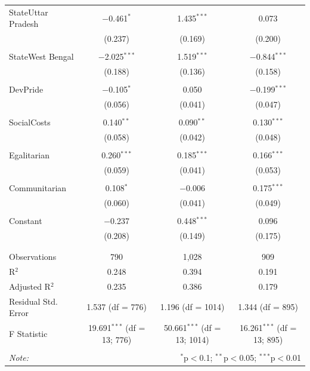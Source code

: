 \documentclass[
]{article}
\begin{document}
\begin{table}[!htbp]
\begin{tabular}{@{\extracolsep{5pt}}lccc}
 StateUttar Pradesh & $-$0.461$^{*}$ & 1.435$^{***}$ & 0.073 \\ 
  & (0.237) & (0.169) & (0.200) \\ 
  & & & \\ 
 StateWest Bengal & $-$2.025$^{***}$ & 1.519$^{***}$ & $-$0.844$^{***}$ \\ 
  & (0.188) & (0.136) & (0.158) \\ 
  & & & \\ 
 DevPride & $-$0.105$^{*}$ & 0.050 & $-$0.199$^{***}$ \\ 
  & (0.056) & (0.041) & (0.047) \\ 
  & & & \\ 
 SocialCosts & 0.140$^{**}$ & 0.090$^{**}$ & 0.130$^{***}$ \\ 
  & (0.058) & (0.042) & (0.048) \\ 
  & & & \\ 
 Egalitarian & 0.260$^{***}$ & 0.185$^{***}$ & 0.166$^{***}$ \\ 
  & (0.059) & (0.041) & (0.053) \\ 
  & & & \\ 
 Communitarian & 0.108$^{*}$ & $-$0.006 & 0.175$^{***}$ \\ 
  & (0.060) & (0.041) & (0.049) \\ 
  & & & \\ 
 Constant & $-$0.237 & 0.448$^{***}$ & 0.096 \\ 
  & (0.208) & (0.149) & (0.175) \\ 
  & & & \\ 
\hline \\[-1.8ex] 
Observations & 790 & 1,028 & 909 \\ 
R$^{2}$ & 0.248 & 0.394 & 0.191 \\ 
Adjusted R$^{2}$ & 0.235 & 0.386 & 0.179 \\ 
Residual Std. Error & 1.537 (df = 776) & 1.196 (df = 1014) & 1.344 (df = 895) \\ 
F Statistic & 19.691$^{***}$ (df = 13; 776) & 50.661$^{***}$ (df = 13; 1014) & 16.261$^{***}$ (df = 13; 895) \\ 
\hline 
\hline \\[-1.8ex] 
\textit{Note:}  & \multicolumn{3}{r}{$^{*}$p$<$0.1; $^{**}$p$<$0.05; $^{***}$p$<$0.01} \\ 
\end{tabular} 
\end{table} 
\endgroup
\end{document}
